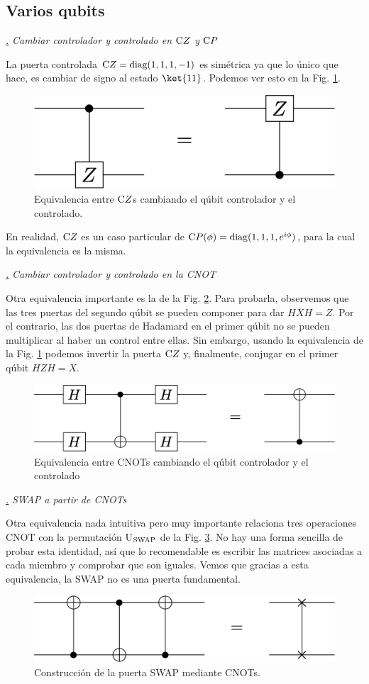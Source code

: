 \documentclass[a4paper,11pt]{book} %
\numberwithin{equation}{chapter}
\newcommand{\cg}[1]{{\rm C}#1}
\def\subsubiContadorIt{\par\addtocounter{subsubsection}{1}\underline{\it\thesubsubsection.}\hskip0.5cm \setcounter{subsubsubsectionIt}{0}}
\newcommand{\SubsubiIt}[1]{
		\subsubiContadorIt \textit{#1}
	}
\newcounter{subsubsubsectionIt}[subsubsection]
\begin{document}
        \subsection{Varios qubits}

			\SubsubiIt{Cambiar controlador y controlado en $\cg{Z}$ y $\cg{P}$}

La puerta  controlada $\cg{Z} =  {\rm diag}(1,1,1,-1)$   es simétrica ya que lo único que hace, es cambiar de signo al estado $\ket{11}$. Podemos ver esto en la Fig. \ref{Fig_elementos_Equiv_Z}.
	\begin{figure}[H]
	\centering 
	\includegraphics[width=0.35\linewidth]{Figuras/Fig_elementos_Equiv_Z}
	\caption{Equivalencia entre $\cg{Z}$s cambiando el qúbit controlador y el controlado.}
	\label{Fig_elementos_Equiv_Z}
	\end{figure}
 En realidad, $\cg{Z}$ es un caso particular de   $\cg{P(\phi)} = {\rm diag} (1,1,1, e^{i\phi})$, para la cual la equivalencia es la misma. 


			\SubsubiIt{Cambiar controlador y controlado en la CNOT} 
			
Otra equivalencia importante es la de la Fig. \ref{Fig_elementos_Equiv_HH}. Para probarla, observemos que las tres puertas del segundo qúbit se pueden componer para dar $HXH=Z$. Por el contrario, las dos puertas de Hadamard en el primer qúbit no se pueden multiplicar al haber un control entre ellas. Sin embargo, usando la  equivalencia de la Fig. \ref{Fig_elementos_Equiv_Z} podemos invertir la puerta $\cg{Z}$ y, finalmente, conjugar en el primer qúbit $HZH=X$.
	\begin{figure}[H]
	\centering 
	\includegraphics[width=0.45\linewidth]{Figuras/Fig_elementos_Equiv_HH}
	\caption{Equivalencia entre CNOTs cambiando el qúbit controlador y el controlado}
	\label{Fig_elementos_Equiv_HH}
	\end{figure}


			\SubsubiIt{SWAP a partir de CNOTs} 

Otra  equivalencia nada intuitiva pero muy importante relaciona tres operaciones CNOT con la permutación U$_{\rm SWAP}$ de la Fig. \ref{Fig_elementos_Equiv_CNOTs}. No hay una forma sencilla de probar esta identidad, así que lo recomendable es escribir las matrices asociadas a cada miembro y comprobar que son iguales. Vemos que gracias a esta equivalencia, la SWAP no es una puerta fundamental.
	\begin{figure}[H]
	\centering 
	\includegraphics[width=0.45\linewidth]{Figuras/Fig_elementos_Equiv_CNOTs}
	\caption{Construcción de la puerta SWAP mediante CNOTs.}
	\label{Fig_elementos_Equiv_CNOTs}
	\end{figure}
\end{document}
